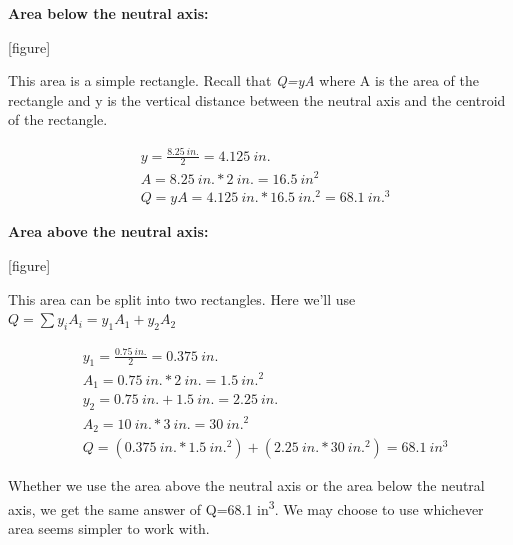 \documentclass[
  letterpaper,
  DIV=11,
  numbers=noendperiod]{scrreprt}
\begin{document}
\begin{tcolorbox}
\begin{tcolorbox}
\textbf{Area below the neutral axis:}

{[}figure{]}

This area is a simple rectangle. Recall that \emph{Q=yA} where A is the
area of the rectangle and y is the vertical distance between the neutral
axis and the centroid of the rectangle.

\[
\begin{aligned}
& y=\frac{8.25{~in.}}{2}=4.125{~in.}  \\
& A=8.25{~in.} * 2{~in.}=16.5{~in} ^2 \\
& Q=y A=4.125{~in.} * 16.5{~in.}^2=68.1{~in.}^3
\end{aligned}
\]

\textbf{Area above the neutral axis:}

{[}figure{]}

This area can be split into two rectangles. Here we'll use
\(Q=\sum y_i A_i=y_1 A_1+y_2 A_2\)

\[
\begin{aligned}
& y_1=\frac{0.75{~in.}}{2}=0.375{~in.} \\
& A_1=0.75{~in.} * 2{~in.}=1.5{~in.}^2 \\
& y_2=0.75{~in.}+1.5{~in.}=2.25{~in.} \\
& A_2=10{~in.} * 3{~in.}=30{~in.}^2 \\
& Q=(0.375{~in.} * 1.5{~in.}^2)+(2.25{~in.} * 30{~in.}^2)=68.1{~in}^3
\end{aligned}
\]

Whether we use the area above the neutral axis or the area below the
neutral axis, we get the same answer of Q=68.1 in\textsuperscript{3}. We
may choose to use whichever area seems simpler to work with.

\end{tcolorbox}

\end{tcolorbox}
\end{document}
